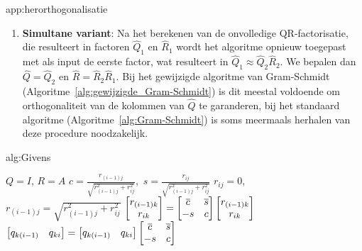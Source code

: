 \begin{app}{app:herorthogonalisatie}
\begin{enumerate}
        \item \textbf{Simultane variant}: Na het berekenen van de onvolledige QR-factorisatie, die resulteert in factoren $\hat{Q}_1$ en $\hat{R}_1$ wordt het algoritme opnieuw toegepast met als input de eerste factor, wat resulteert in $\hat{Q}_1 \approx \hat{Q}_2\hat{R}_2$. We bepalen dan $\hat{Q} = \hat{Q}_2$ en $\hat{R} = \hat{R}_2\hat{R}_1$. Bij het gewijzigde algoritme van Gram-Schmidt (Algoritme~\ref{alg:gewijzigde_Gram-Schmidt}) is dit meestal voldoende om orthogonaliteit van de kolommen van $\hat{Q}$ te garanderen, bij het standaard algoritme (Algoritme~\ref{alg:Gram-Schmidt}) is soms meermaals herhalen van deze procedure noodzakelijk.
    \end{enumerate}
\end{app}

\newpage

\begin{alg}{alg:Givens}
    \vspace{-0.3cm}
    \begin{tcolorbox}[colback=white, colframe=gray, arc=0mm] 
        \begin{algorithmic}[1]
            \State $Q = I$, $R = A$
                    \State $c = \frac{r_{(i-1)j}}{\sqrt{r_{(i-1)j}^2 + r_{ij}^2}}$,\ $s = \frac{r_{ij}}{\sqrt{r_{(i-1)j}^2 + r_{ij}^2}}$
                    \State $r_{ij} = 0$, \ $r_{(i-1)j} = \sqrt{r_{(i-1)j}^2 + r_{ij}^2}$
                       \State $\bmatrix r_{(i-1)k} \\ r_{ik} \endbmatrix = \begin{bmatrix} \overline{c} & \overline{s} \\ -s & c \end{bmatrix} \bmatrix r_{(i-1)k} \\ r_{ik} \endbmatrix$
                    \EndFor
                    \State $\bmatrix q_{k(i-1)} & q_{ki}\endbmatrix = \bmatrix q_{k(i-1)} & q_{ki} \endbmatrix \begin{bmatrix} \overline{c} & \overline{s} \\ -s & c \end{bmatrix}$
                 \EndFor
                \EndFor
            \EndFor 
        \end{algorithmic}
    \end{tcolorbox}
    \vspace{-0.3cm}
\end{alg}

